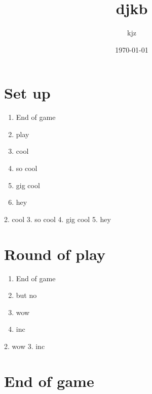 \documentclass{article}%
\title{djkb}%
\author{kjz}%
\date{\today}%
\begin{document}
%
\pagestyle{empty}%
\normalsize%
\maketitle%
\section{ Set up
}%
\label{sec:Setup}%
\begin{enumerate}%
\item%
End of game%
\item%
 play
%
\item%
 cool
%
\item%
 so cool
%
\item%
 gig cool
%
\item%
 hey
%
\end{enumerate}%
2. cool
%
3. so cool
%
4. gig cool
%
5. hey


%
\section{ Round of play
}%
\label{sec:Roundofplay}%
\begin{enumerate}%
\item%
End of game%
\item%
 but no
%
\item%
 wow
%
\item%
 inc
%
\end{enumerate}%
2. wow
%
3. inc


%
\section{ End of game}%
\label{sec:Endofgame}%

%
\end{document}
